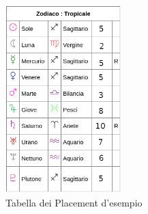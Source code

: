 \begin{figure}[H]
\centering
\includegraphics[width=0.4\textwidth,height=0.4\textheight,keepaspectratio]{img/exampleTable.png}
\caption{Tabella dei Placement d'esempio}
\label{fig:exampleTable}
\end{figure}

